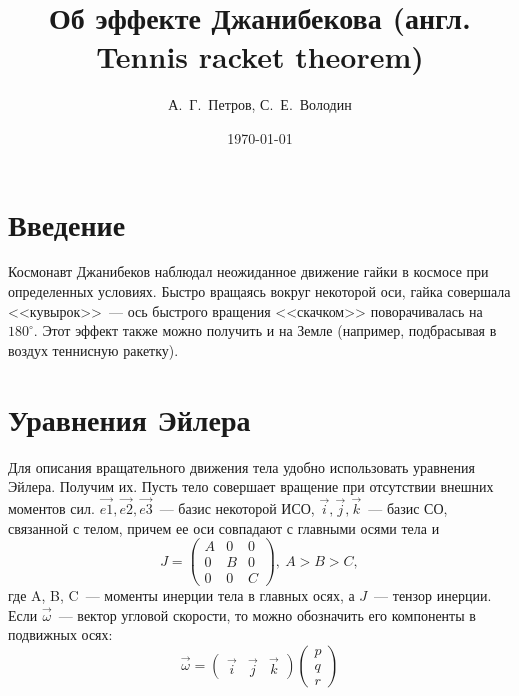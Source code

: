 \documentclass{article}
\title{Об эффекте Джанибекова (англ. Tennis racket theorem)}
\date{\today}
\author{А.~Г.~Петров, С.~Е.~Володин}
\newcommand{\degree}{^{\circ}}
\begin{document}
\maketitle
\section{Введение}
Космонавт Джанибеков наблюдал неожиданное движение гайки в космосе при определенных условиях. Быстро вращаясь вокруг некоторой оси, гайка совершала <<кувырок>>~--- ось быстрого вращения <<скачком>> поворачивалась на \begin{math} 180\degree \end{math}. Этот эффект также можно получить и на Земле (например, подбрасывая в воздух теннисную ракетку).
\section{Уравнения Эйлера}
Для описания вращательного движения тела удобно использовать уравнения Эйлера. Получим их.
Пусть тело совершает вращение при отсутствии внешних моментов сил.
\begin{math}
\vec{e1}, \vec{e2}, \vec{e3}
\end{math}~--- базис некоторой ИСО,
\begin{math}
\vec{i}, \vec{j}, \vec{k}
\end{math}~--- базис СО, связанной с телом, причем ее оси совпадают с главными осями тела и
\begin{equation}
J=\left( \begin{array}{lcr} A & 0 & 0\\ 0 & B & 0\\ 0 & 0 & C \end{array} \right),\ A > B > C,
\end{equation}
где A, B, C~--- моменты инерции тела в главных осях, а \begin{math} J \end{math}~--- тензор инерции. Если \begin{math} \vec{\omega} \end{math}~--- вектор угловой скорости, то можно обозначить его компоненты в подвижных осях:
\begin{equation}
\vec{\omega}=
\left( \begin{array}{lcr} \vec{i} & \vec{j} & \vec{k} \end{array} \right)
\left( \begin{array}{lcr} p\\q\\r \end{array} \right)
\end{equation}
\end{document}
